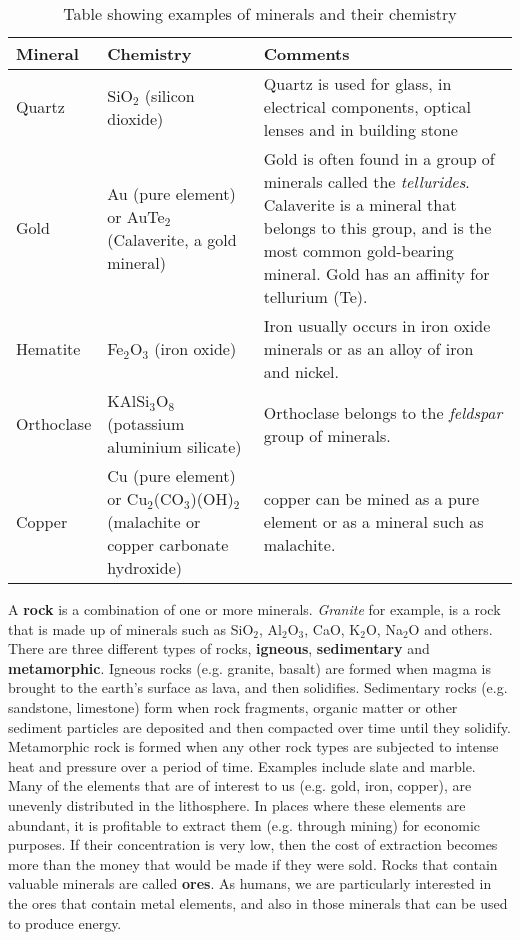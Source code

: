 \begin{table}[h]
\begin{center}
\caption{Table showing examples of minerals and their chemistry}
\label{tab:minerals}
\begin{tabular}{|l|p{4cm}|p{6cm}|}\hline
\textbf{Mineral} & \textbf{Chemistry} & \textbf{Comments}\\\hline
Quartz & SiO$_{2}$ (silicon dioxide) & Quartz is used for glass, in electrical components, optical lenses and in building stone \\\hline
Gold & Au (pure element) or AuTe$_{2}$ (Calaverite, a gold mineral) & Gold is often found in a group of minerals called the \textit{tellurides}. Calaverite is a mineral that belongs to this group, and is the most common gold-bearing mineral. Gold has an affinity for tellurium (Te). \\\hline
Hematite & Fe$_{2}$O$_{3}$ (iron oxide) & Iron usually occurs in iron oxide minerals or as an alloy of iron and nickel. \\\hline
Orthoclase & KAlSi$_{3}$O$_{8}$ (potassium aluminium silicate) & Orthoclase belongs to the \textit{feldspar} group of minerals. \\\hline
Copper & Cu (pure element) or Cu$_{2}$(CO$_{3}$)(OH)$_{2}$ (malachite or copper carbonate hydroxide) & copper can be mined as a pure element or as a mineral such as malachite. \\\hline
\end{tabular}
\end{center}
\end{table}

A \textbf{rock} is a combination of one or more minerals. \textit{Granite} for example, is a rock that is made up of minerals such as SiO$_{2}$, Al$_{2}$O$_{3}$, CaO, K$_{2}$O, Na$_{2}$O and others. There are three different types of rocks, \textbf{igneous}, \textbf{sedimentary} and \textbf{metamorphic}. Igneous rocks (e.g. granite, basalt) are formed when magma is brought to the earth's surface as lava, and then solidifies. Sedimentary rocks (e.g. sandstone, limestone) form when rock fragments, organic matter or other sediment particles are deposited and then compacted over time until they solidify. Metamorphic rock is formed when any other rock types are subjected to intense heat and pressure over a period of time. Examples include slate and marble.\\


Many of the elements that are of interest to us (e.g. gold, iron, copper), are unevenly distributed in the lithosphere. In places where these elements are abundant, it is profitable to extract them (e.g. through mining) for economic purposes. If their concentration is very low, then the cost of extraction becomes more than the money that would be made if they were sold. Rocks that contain valuable minerals are called \textbf{ores}. As humans, we are particularly interested in the ores that contain metal elements, and also in those minerals that can be used to produce energy. 

